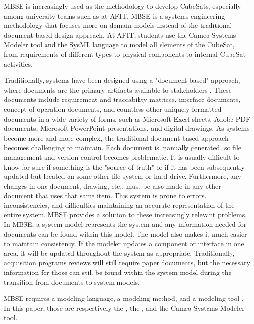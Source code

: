 
MBSE is increasingly used as the methodology to develop CubeSats, especially among university teams such as at AFIT. MBSE is a systems engineering methodology that focuses more on domain models instead of the traditional document-based design approach. At AFIT, students use the Cameo Systems Modeler tool and the SysML language to model all elements of the CubeSat, from requirements of different types to physical components to internal CubeSat activities.  

Traditionally, systems have been designed using a "document-based" approach, where documents are the primary artifacts available to stakeholders \citep{Delligatti}. These documents include requirement and traceability matrices, interface documents, concept of operation documents, and countless other uniquely formatted documents in a wide variety of forms, such as Microsoft Excel sheets, Adobe PDF documents, Microsoft PowerPoint presentations, and digital drawings. As systems become more and more complex, the traditional document-based approach becomes challenging to maintain. Each document is manually generated, so file management and version control becomes problematic. It is usually difficult to know for sure if something is the "source of truth" or if it has been subsequently updated but located on some other file system or hard drive. Furthermore, any changes in one document, drawing, etc., must be also made in any other document that uses that same item. This system is prone to errors, inconsistencies, and difficulties maintaining an accurate representation of the entire system. MBSE provides a solution to these increasingly relevant problems. In MBSE, a system model represents the system and any information needed for documents can be found within this model. The model also makes it much easier to maintain consistency. If the modeler updates a component or interface in one area, it will be updated throughout the system as appropriate. Traditionally, acquisition programs reviews will still require paper documents, but the necessary information for those can still be found within the system model during the transition from documents to system models. 

MBSE requires a modeling language, a modeling method, and a modeling tool \citep{Delligatti}. In this paper, those are respectively the , the , and the Cameo Systems Modeler tool.  


